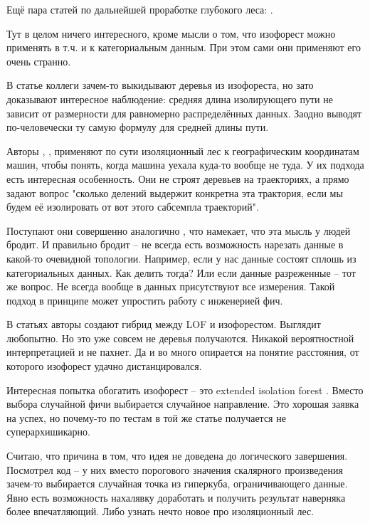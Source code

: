 \documentclass[12pt]{article}
\begin{document}
Ещё пара статей по дальнейшей проработке глубокого леса:
\cite{utkinDeepForestClassifier2019}
.

Тут
\cite{sunDetectingAnomalousUser2016}
в целом ничего интересного, кроме мысли о том, что изофорест можно применять в т.ч.
и к категориальным данным. При этом сами они применяют его очень странно.

В статье
\cite{vinhDiscoveringOutlyingAspects2016}
коллеги зачем-то выкидывают деревья из изофореста, но зато доказывают интересное
наблюдение: средняя длина изолирующего пути не зависит от размерности для
равномерно распределённых данных. Заодно выводят по-человечески ту самую формулу
для средней длины пути.

Авторы
\cite{linDisorientationDetectionMining2015a},
\cite{zhangIBATDetectingAnomalous2011},
\cite{chenIBOATIsolationBasedOnline2013}
\cite{chenRealTimeDetectionAnomalous2012}
применяют по сути изоляционный лес к географическим координатам машин, чтобы понять,
когда машина уехала куда-то вообще не туда. У их подхода есть интересная особенность.
Они не строят деревьев на траекториях, а прямо задают вопрос "сколько делений выдержит
конкретна эта трактория, если мы будем её изолировать от вот этого сабсемпла
траекторий".

Поступают они совершенно аналогично
\cite{vinhDiscoveringOutlyingAspects2016}
, что намекает, что эта мысль у людей бродит. И правильно бродит -- не всегда есть
возможность нарезать данные в какой-то очевидной топологии. Например, если у нас
данные состоят сплошь из категориальных данных. Как делить тогда? Или если данные
разреженные -- тот же вопрос. Не всегда вообще в данных присутствуют все измерения.
Такой подход в принципе может упростить работу с инженерией фич.

В статьях
\cite{bandaragodaEfficientAnomalyDetection2014a}
\cite{bandaragodaIsolationbasedAnomalyDetection2018}
авторы создают гибрид между LOF и изофорестом. Выглядит любопытно. Но это уже
совсем не деревья получаются. Никакой вероятностной интерпретацией и не пахнет.
Да и во много опирается на понятие расстояния, от которого изофорест удачно
дистанцировался.

Интересная попытка обогатить изофорест -- это extended isolation forest
\cite{haririExtendedIsolationForest2021}
. Вместо выбора случайной фичи выбирается случайное направление. Это хорошая
заявка на успех, но почему-то по тестам в той же статье получается не
суперархишикарно.

Считаю, что причина в том, что идея не доведена до логического
завершения. Посмотрел код -- у них вместо порогового значения скалярного произведения
зачем-то выбирается случайная точка из гиперкуба, ограничивающего данные. Явно есть
возможность нахалявку доработать и получить результат наверняка более впечатляющий.
Либо узнать нечто новое про изоляционный лес.
\end{document}
